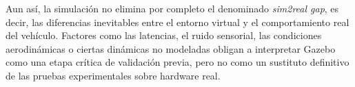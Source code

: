 \vspace{0.3cm}

Aun así, la simulación no elimina por completo el denominado \textit{sim2real gap}, es decir, las diferencias inevitables entre el entorno virtual y el comportamiento real del vehículo. Factores como las latencias, el ruido sensorial, las condiciones aerodinámicas o ciertas dinámicas no modeladas obligan a interpretar Gazebo como una etapa crítica de validación previa, pero no como un sustituto definitivo de las pruebas experimentales sobre hardware real.
